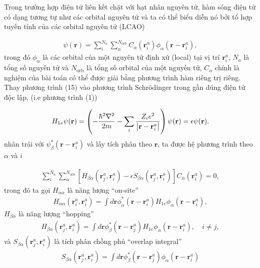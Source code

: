 \documentclass{article}
\newcommand{\dps}{\displaystyle}
\begin{document}
Trong trường hợp điện tử liên kết chặt với hạt nhân nguyên tử, hàm sóng điện tử có dạng tương tự như các orbital nguyên tử và ta có thể biểu diễn nó bởi tổ hợp tuyến tính của các orbital nguyên tử (LCAO)

\begin{gather}
	\psi(\mathbf{r}) = \sum_{i}^{N_{a}} \sum_{\alpha}^{N_{\text{orb}}} C_{\alpha}(\mathbf{r}_{i}^{\alpha}) \phi_{\alpha}(\mathbf{r} - \mathbf{r}_{i}^{a}),
\end{gather}
trong đó $\phi_{\alpha}$ là các orbital của một nguyên tử định xứ (local) tại vị trí $\mathbf{r}_{i}^{a}$, $N_{a}$ là tổng số nguyên tử và $N_{\text{orb}}$ là tổng số orbital của một nguyên tử, $C_{\alpha}$ chính là nghiệm của bài toán có thể được giải bằng phương trình hàm riêng trị riêng. Thay phương trình (15) vào phương trình Schr\"{o}dinger trong gần dúng điện tử độc lập, (i.e phương trình (1))

\begin{gather}
	H_{1e}\psi(\mathbf{r}) = \left(- \frac{\hbar^{2}\nabla^{2}}{2m} - \sum_{i} \frac{Z_{i} e^{2}}{\abs{\mathbf{r} - \mathbf{r}_{i}^{a}}} \right) \psi(\mathbf{r}) = \epsilon \psi(\mathbf{r}).
\end{gather}
nhân trái với $\psi_{\beta}^{*}(\mathbf{r} - \mathbf{r}_{i}^{a})$ và lấy tích phân theo $\mathbf{r}$, ta được hệ phương trình theo $\alpha$ và $i$

\begin{gather}
	\sum_{i}^{N_{a}} \sum_{\alpha}^{N_{\text{orb}}} \left[H_{\beta \alpha} (\mathbf{r}_{j}^{a}, \mathbf{r}_{i}^{a}) - \epsilon S_{\beta \alpha} (\mathbf{r}_{j}^{a}, \mathbf{r}_{i}^{a}) \right] C_{\alpha}(\mathbf{r}_{i}^{a}) = 0,
\end{gather}
trong đó ta gọi $H_{\alpha \alpha}$ là năng lượng ``on-site''
\begin{gather}
	H_{\alpha \alpha} (\mathbf{r}_{i}^{a}, \mathbf{r}_{i}^{a}) = \dps \int d\mathbf{r} \phi_{\alpha}^{*}(\mathbf{r} - \mathbf{r}_{i}^{a}) H_{1e} \phi_{\alpha}(\mathbf{r} - \mathbf{r}_{i}^{a}),
\end{gather}
$H_{\beta \alpha}$ là năng lượng ``hopping'' 
\begin{gather}
	H_{\beta \alpha} (\mathbf{r}_{j}^{a}, \mathbf{r}_{i}^{a}) = \dps \int d\mathbf{r} \phi_{\beta}^{*}(\mathbf{r} - \mathbf{r}_{j}^{a}) H_{1e} \phi_{\alpha}(\mathbf{r} - \mathbf{r}_{i}^{a}), \quad i \neq j,
\end{gather}
và $S_{\beta \alpha} (\mathbf{r}_{j}^{a}, \mathbf{r}_{i}^{a})$  là tích phân chồng phủ ``overlap integral''
\begin{gather}
	S_{\beta \alpha} (\mathbf{r}_{j}^{a}, \mathbf{r}_{i}^{a}) = \dps \int d\mathbf{r} \phi_{\beta}^{*}(\mathbf{r} - \mathbf{r}_{j}^{a}) \phi_{\alpha}(\mathbf{r} - \mathbf{r}_{i}^{a})
\end{gather}
\end{document}
